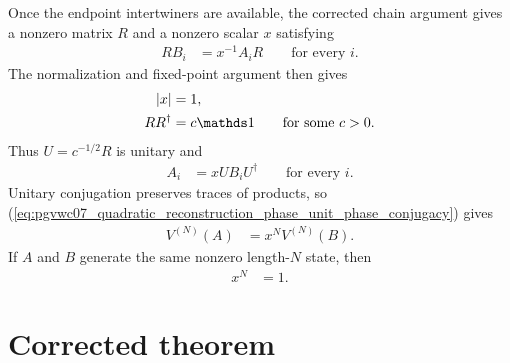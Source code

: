 \documentclass{article}
\begin{document}
Once the endpoint intertwiners are available, the corrected chain argument
gives a nonzero matrix $R$ and a nonzero scalar $x$ satisfying
\begin{align}
    RB_i
     & =x^{-1}A_iR
    \qquad\text{for every }i.
    \label{eq:pgvwc07_quadratic_reconstruction_phase_intertwiner}
\end{align}
The normalization and fixed-point argument then gives
\begin{align}
    |x|
     & =1,
    \label{eq:pgvwc07_quadratic_reconstruction_phase_intertwiner_modulus} \\
    RR^\dagger
     & =c\Id
    \qquad\text{for some }c>0.
    \label{eq:pgvwc07_quadratic_reconstruction_phase_intertwiner_norm}
\end{align}
Thus $U=c^{-1/2}R$ is unitary and
\begin{align}
    A_i
     & =xUB_iU^\dagger
    \qquad\text{for every }i.
    \label{eq:pgvwc07_quadratic_reconstruction_phase_unit_phase_conjugacy}
\end{align}
Unitary conjugation preserves traces of products, so
(\ref{eq:pgvwc07_quadratic_reconstruction_phase_unit_phase_conjugacy}) gives
\begin{align}
    V^{(N)}(A)
     & =x^NV^{(N)}(B).
    \label{eq:pgvwc07_quadratic_reconstruction_phase_same_state_phase_relation}
\end{align}
If $A$ and $B$ generate the same nonzero length-$N$ state, then
\begin{align}
    x^N
     & =1.
    \label{eq:pgvwc07_quadratic_reconstruction_phase_root_condition}
\end{align}

\section{Corrected theorem}
\end{document}
